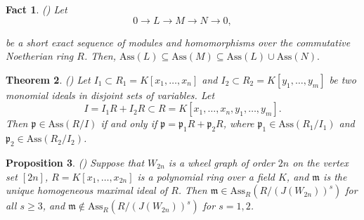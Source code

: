 \documentclass[11pt]{amsart}
\newtheorem{theorem}{Theorem}[section]
\newtheorem{fact}[theorem]{Fact}
\newtheorem{proposition}[theorem]{Proposition}
\begin{document}


\begin{fact}\label{fact3} (\cite[Exercise 9.42]{sharp}) 
Let 
$$0\longrightarrow L{\longrightarrow} M {\longrightarrow} N  \longrightarrow  0,$$

be a short exact sequence of modules and homomorphisms over the commutative Noetherian ring $R$. Then, 
$\mathrm{Ass}(L) \subseteq  \mathrm{Ass}(M) \subseteq  \mathrm{Ass}(L) \cup  \mathrm{Ass}(N).$ 
\end{fact}


\begin{theorem} (\cite[Theorem 3.3]{SNQ})   \label{SNQ.Th.3.3}
 Let $I_1\subset R_1=K[x_1, \ldots, x_n]$ and  $I_2\subset R_2=K[y_1, \ldots, y_m]$ be two monomial ideals in disjoint sets of variables. Let 
$$I=I_1R+I_2R\subset R=K[x_1, \ldots, x_n, y_1, \ldots, y_m].$$ 
Then $\mathfrak{p}\in \mathrm{Ass}(R/I)$ if and only if $\mathfrak{p}=\mathfrak{p}_1R + \mathfrak{p}_2R$, where 
$ \mathfrak{p}_1\in \mathrm{Ass}(R_1/I_1)$ and $ \mathfrak{p}_2\in \mathrm{Ass}(R_2/I_2)$.
\end{theorem}





\begin{proposition}\label{PRO.WHEEL.1} (\cite[Proposition 3.10]{NKA})
Suppose that $W_{2n}$ is  a wheel graph of order $2n$ on the  vertex set $[2n]$, $R=K[x_1, \ldots, x_{2n}]$ is a  polynomial ring over a field $K$,
 and $\mathfrak{m}$ is the unique homogeneous maximal ideal  of $R$. Then  $\mathfrak{m}\in \mathrm{Ass}_R(R/(J(W_{2n}))^s)$  for all $s\geq 3$, and $\mathfrak{m}\notin \mathrm{Ass}_R(R/(J(W_{2n}))^s)$ for $s=1,2$.
 \end{proposition}
 
 
\end{document}
